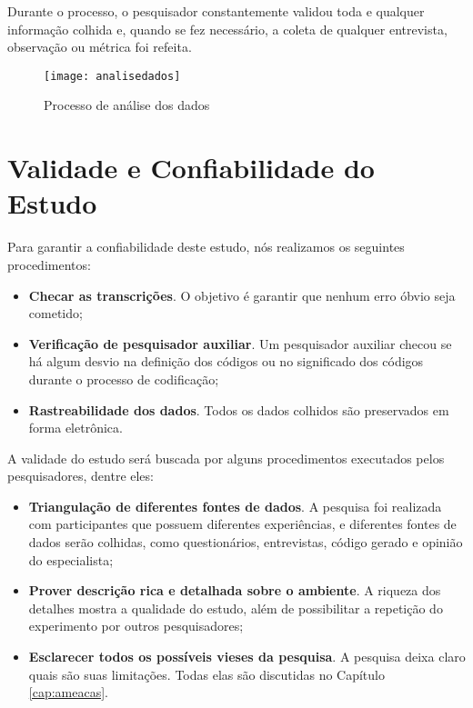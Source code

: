
Durante o processo, o pesquisador constantemente validou toda e qualquer
informação colhida e, quando se fez necessário, a coleta de qualquer entrevista,
observação ou métrica foi refeita. 

\begin{figure}
  \centering
  \texttt{[image: analisedados]}
  \caption{Processo de análise dos dados}
  \label{fig:analise-dados}
\end{figure}

\section{Validade e Confiabilidade do Estudo}
\label{sec:planejamento-validacao}

Para garantir a confiabilidade deste estudo, nós realizamos os
seguintes procedimentos:

\begin{itemize}
	\item \textbf{Checar as transcrições}. O objetivo é garantir que nenhum erro
	óbvio seja cometido;

	\item \textbf{Verificação de pesquisador auxiliar}. Um pesquisador auxiliar
	checou se há algum desvio na definição dos códigos ou no significado dos códigos 
	durante o processo de codificação;
	
	\item \textbf{Rastreabilidade dos dados}. Todos os dados colhidos são
	preservados em forma eletrônica.

\end{itemize}

A validade do estudo será buscada por alguns procedimentos executados pelos
pesquisadores, dentre eles:

\begin{itemize}
	\item \textbf{Triangulação de diferentes fontes de dados}. A pesquisa foi
	realizada com participantes que possuem diferentes experiências, e diferentes
	fontes de dados serão colhidas, como questionários, entrevistas, código gerado e 
	opinião do especialista;

	\item \textbf{Prover descrição rica e detalhada sobre o ambiente}. A riqueza
	dos detalhes mostra a qualidade do estudo, além de possibilitar a repetição do
	experimento por outros pesquisadores;

	\item \textbf{Esclarecer todos os possíveis vieses da pesquisa}. A pesquisa
	deixa claro quais são suas limitações. Todas elas são discutidas no Capítulo
	\ref{cap:ameacas}.

\end{itemize}

